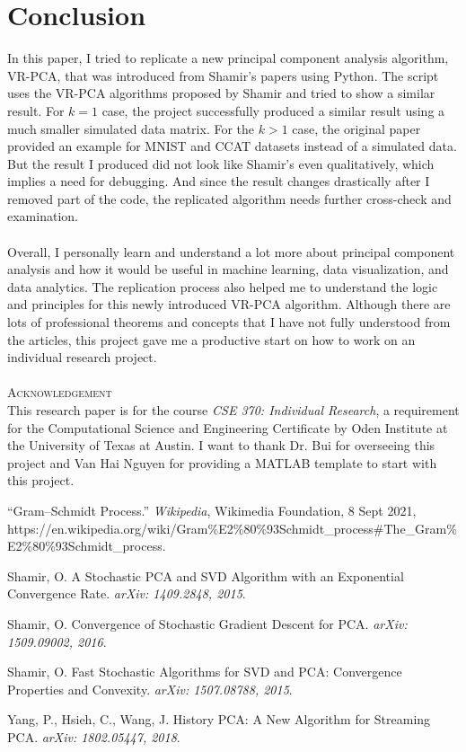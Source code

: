\documentclass{article}
\begin{document}
\section{Conclusion}
In this paper, I tried to replicate a new principal component analysis algorithm, VR-PCA, that was introduced from Shamir’s papers using Python. The script uses the VR-PCA algorithms proposed by Shamir and tried to show a similar result. For $k = 1$ case, the project successfully produced a similar result using a much smaller simulated data matrix. For the $k > 1$ case, the original paper provided an example for MNIST and CCAT datasets instead of a simulated data. But the result I produced did not look like Shamir’s even qualitatively, which implies a need for debugging. And since the result changes drastically after I removed part of the code, the replicated algorithm needs further cross-check and examination. \\ \\
Overall, I personally learn and understand a lot more about principal component analysis and how it would be useful in machine learning, data visualization, and data analytics. The replication process also helped me to understand the logic and principles for this newly introduced VR-PCA algorithm. Although there are lots of professional theorems and concepts that I have not fully understood from the articles, this project gave me a productive start on how to work on an individual research project.\\ \\
\textsc{Acknowledgement}\\
This research paper is for the course \emph{CSE 370: Individual Research}, a requirement for the Computational Science and Engineering Certificate by Oden Institute at the University of Texas at Austin. I want to thank Dr. Bui for overseeing this project and Van Hai Nguyen for providing a MATLAB template to start with this project. 

\begin{thebibliography}{5}
“Gram–Schmidt Process.” \emph{Wikipedia}, Wikimedia Foundation, 8 Sept 2021, https://en.wikipedia.org/wiki/Gram\%E2\%80\%93Schmidt\_process\#The\_Gram\%E2\%80\%93Schmidt\_process.

Shamir, O. A Stochastic PCA and SVD Algorithm with an Exponential Convergence Rate. \emph{arXiv: 1409.2848, 2015}. 

Shamir, O. Convergence of Stochastic Gradient Descent for PCA. \emph{arXiv: 1509.09002, 2016}.

Shamir, O. Fast Stochastic Algorithms for SVD and PCA: Convergence Properties and Convexity. \emph{arXiv: 1507.08788, 2015}.

Yang, P., Hsieh, C., Wang, J. History PCA: A New Algorithm for Streaming PCA. \emph{arXiv: 1802.05447, 2018}. 

\end{thebibliography}
\end{document}
